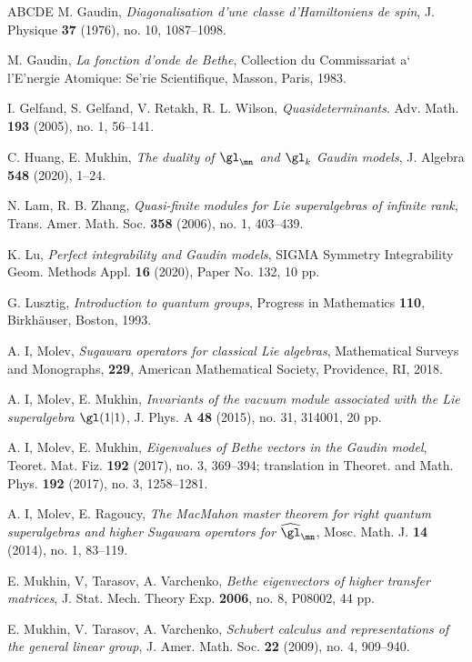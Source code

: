 \documentclass[11pt, reqno]{amsart}
\theoremstyle{definition}
\theoremstyle{remark}
\numberwithin{equation}{section}
\begin{document}
\begin{thebibliography}{ABCDE}
 M.  Gaudin, \emph{Diagonalisation d'une classe d'Hamiltoniens de spin}, J. Physique \textbf{37} (1976), no. 10, 1087--1098.

 M. Gaudin, \emph{La fonction d'onde de Bethe}, Collection du Commissariat a` l'E'nergie Atomique: Se'rie Scientifique, Masson, Paris, 1983.

 I. Gelfand, S. Gelfand, V. Retakh, R. L. Wilson, \emph{Quasideterminants}. Adv. Math. \textbf{193} (2005), no. 1, 56--141.

 C. Huang, E. Mukhin, \emph{The duality of $\gl_{\mn}$ and $\gl_k$ Gaudin models}, J. Algebra \textbf{548} (2020), 1--24.

 N. Lam, R. B. Zhang, \emph{Quasi-finite modules for Lie superalgebras of infinite rank}, Trans. Amer. Math. Soc. \textbf{358} (2006), no. 1, 403--439.

 K. Lu, \emph{Perfect integrability and Gaudin models}, SIGMA Symmetry Integrability Geom. Methods Appl. \textbf{16} (2020), Paper No. 132, 10 pp.

 G. Lusztig, \emph{Introduction to quantum groups}, Progress in Mathematics \textbf{110}, Birkh\"{a}user, Boston, 1993.

 A. I, Molev, \emph{Sugawara operators for classical Lie algebras}, Mathematical Surveys and Monographs, \textbf{229}, American Mathematical Society, Providence, RI, 2018.

 A. I, Molev, E. Mukhin, \emph{Invariants of the vacuum module associated with the Lie superalgebra $\gl(1|1)$}, J. Phys. A \textbf{48} (2015), no. 31, 314001, 20 pp.

 A. I, Molev, E. Mukhin, \emph{Eigenvalues of Bethe vectors in the Gaudin model}, Teoret. Mat. Fiz. \textbf{192} (2017), no. 3, 369--394; translation in Theoret. and Math. Phys. \textbf{192} (2017), no. 3, 1258--1281.

 A. I, Molev, E. Ragoucy, \emph{The MacMahon master theorem for right quantum superalgebras and higher Sugawara operators for $\widehat{\gl}_{\mn}$}, Mosc. Math. J. \textbf{14} (2014), no. 1, 83--119.

 E. Mukhin, V, Tarasov, A. Varchenko, \emph{Bethe eigenvectors of higher transfer matrices}, J. Stat. Mech. Theory Exp. \textbf{2006}, no. 8, P08002, 44 pp.

  E. Mukhin, V. Tarasov, A. Varchenko, \emph{Schubert calculus and representations of the general linear group}, J. Amer. Math. Soc. \textbf{22} (2009), no. 4, 909--940.


\end{thebibliography}
\end{document}
